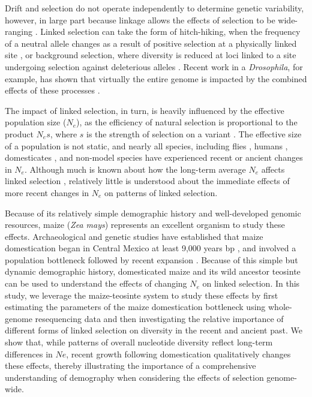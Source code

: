 \documentclass{pnastwo}
\begin{document}
\begin{article}
Drift and selection do not operate independently to determine genetic variability, however, in large part because linkage allows the effects of selection to be wide-ranging \cite{smith1974, li2012,slotte2014}. 
Linked selection can take the form of hitch-hiking, when the frequency of a neutral allele changes as a result of positive selection at a physically linked site \cite{smith1974}, or background selection, where diversity is reduced at loci linked to a site undergoing selection against deleterious alleles \cite{charlesworth1993}. 
Recent work in a \emph{Drosophila}, for example, has shown that virtually the entire genome is impacted by the combined effects of these processes \cite{sella2009,elyashiv2014,andolfatto2005}.

The impact of linked selection, in turn, is heavily influenced by the effective population size ($N_e$), as the  efficiency of natural selection is proportional to the product $N_es$, where $s$ is the strength of selection on a variant \cite{cutter2013, slotte2014, corbett2015,leffler2012}.
The effective size of a population is not static, and nearly all species, including flies \cite{duchen2013}, humans \cite{reich1998}, domesticates \cite{hyten2006, bovine2009}, and non-model species \cite{ellegren2014} have experienced recent or ancient changes in $N_e$. 
Although much is known about how the long-term average $N_e$ affects linked selection \cite{cutter2013}, relatively little is understood about the immediate effects of more recent changes in $N_e$ on patterns of linked selection.

Because of its relatively simple demographic history and well-developed genomic resources, maize (\emph{Zea mays}) represents an excellent organism to study these effects. 
Archaeological and genetic studies have established that maize domestication began in Central Mexico at least 9,000 years bp \cite{smith1995,matsuoka2002}, and involved a population bottleneck followed by recent expansion \cite{wright2005,eyre1998,tenaillon2004}.
Because of this simple but dynamic demographic history, domesticated maize and its wild ancestor teosinte can be used to understand the effects of changing $N_e$ on linked selection. 
In this study, we leverage the maize-teosinte system to study these effects by first estimating the parameters of the maize domestication bottleneck using whole-genome resequencing data and then investigating the relative importance of different forms of linked selection on diversity in the recent and ancient past. 
We show that, while patterns of overall nucleotide diversity reflect long-term differences in $Ne$, recent growth following domestication qualitatively changes these effects, thereby illustrating the importance of a comprehensive understanding of demography when considering the effects of selection genome-wide. 


\end{article}
\end{document}
